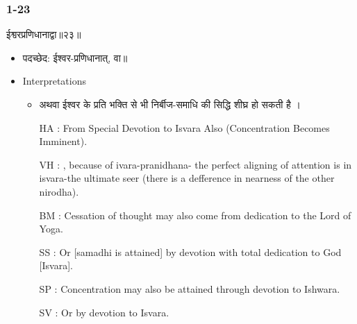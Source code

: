 \begin{frame}[fragile]\frametitle{1-23}
\begin{sanskrit}
ईश्वरप्रणिधानाद्वा॥२३॥
\end{sanskrit}

	\begin{itemize}
	\item पदच्छेद: ईश्वर-प्रणिधानात्, वा॥
	\item Interpretations
		\begin{itemize}	
		\item अथवा ईश्वर के प्रति भक्ति से भी निर्बीज-समाधि की सिद्धि शीघ्र हो सकती है ।
		\item [HA]: From Special Devotion to Isvara Also (Concentration Becomes Imminent).
		\item [VH]: , because of ivara-pranidhana- the perfect aligning of attention is in isvara-the ultimate seer (there is a defference in nearness of the other nirodha).
		\item [BM]: Cessation of thought may also come from dedication to the Lord of Yoga.
		\item [SS]: Or [samadhi is attained] by devotion with total dedication to God [Isvara].
		\item [SP]: Concentration may also be attained through devotion to Ishwara.
		\item [SV]: Or by devotion to Isvara. 
		\end{itemize}
	\end{itemize}
	
\end{frame}

